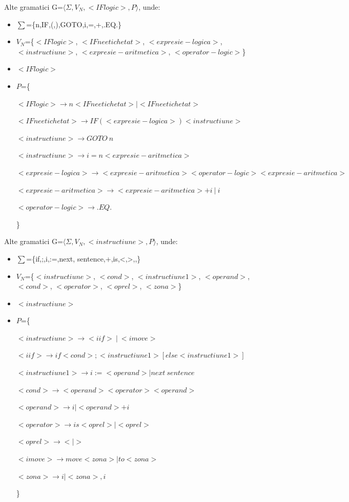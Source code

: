 \documentclass[pdf]{beamer}
\begin{document}
\begin{frame}{Alte gramatici}
G=$\langle \Sigma, V_N, <IF logic>, P \rangle$, unde:

\begin{itemize}
\item
$\sum$=\{n,IF,(,),GOTO,i,=,+,.EQ.\}
\item
$V_N$=\{$<IF logic>$, $<IF neetichetat>$, $<expresie-logica>$, $<instructiune>$, $<expresie-aritmetica>$, $<operator-logic>$\}
\item
$<IF logic>$
\item
$P$=\{

$<IF logic> \rightarrow n <IF neetichetat> | <IF neetichetat> $

$<IF neetichetat> \rightarrow IF ( <expresie-logica> ) <instructiune>$

$<instructiune> \rightarrow GOTO \ n $

$<instructiune> \rightarrow i =  n <expresie-aritmetica>$

$<expresie-logica> \rightarrow <expresie-aritmetica> <operator-logic> <expresie-aritmetica>$

$<expresie-aritmetica> \rightarrow <expresie-aritmetica> + i \  | \ i$

$<operator-logic> \rightarrow .EQ.$

\}
\end{itemize}

\end{frame}



\begin{frame}{Alte gramatici}
G=$\langle \Sigma, V_N, <instructiune>, P \rangle$, unde:

\begin{itemize}
\item
$\sum$=\{if,;,i,:=,next, sentence,+,is,<,>,,\}
\item
$V_N$=\{$<instructiune>$, $<cond>$, $<instructiune1>$, $<operand>$, $<cond>$, $<operator>$, $<oprel>$, $<zona>$\}
\item
$<instructiune>$
\item
$P$=\{

$<instructiune> \rightarrow <iif> \ | \ <imove>$

$< iif > \rightarrow if <cond> ; <instructiune1> [else < instructiune1> ]$

$< instructiune1 > \rightarrow i := <operand> | next \ sentence  $

$<cond> \rightarrow <operand> <operator> <operand>$

$<operand> \rightarrow i |  <operand> +  i$

$<operator> \rightarrow is <oprel> |  <oprel>$

$<oprel> \rightarrow < | > $

$<imove> \rightarrow move <zona> | to <zona>$

$<zona> \rightarrow i | <zona> , i$

\}
\end{itemize}

\end{frame}
\end{document}
